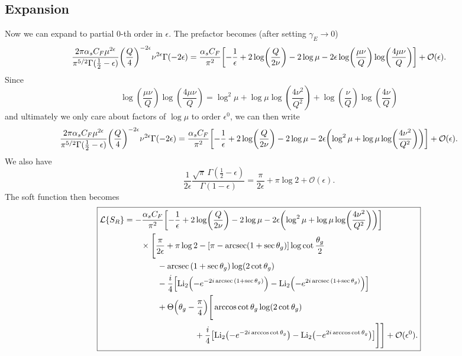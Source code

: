 \documentclass[11pt,twoside,reqno]{amsart}
\theoremstyle{plain}
\theoremstyle{remark}
\theoremstyle{definition}
\theoremstyle{remark}
\theoremstyle{definition}
\theoremstyle{definition}
\newcommand{\cL}{\mathcal{L}}
\newcommand{\cO}{\mathcal{O}}
\newcommand{\Li}{\mathrm{Li}}
\begin{document}
\subsection{Expansion}
	Now we can expand to partial $0$-th order in $\epsilon$. The prefactor becomes (after setting $\gamma_E \to 0$)
	\begin{equation}
	\begin{aligned}
		\frac{2\pi\alpha_s C_F\mu^{2\epsilon}}{\pi^{5/2} \Gamma(\frac{1}{2} - \epsilon)}\qty(\frac{Q}{4})^{-2\epsilon} \nu^{2\epsilon} \Gamma(-2\epsilon) = \frac{\alpha_s C_F}{\pi^2}\qty[-\frac{1}{\epsilon} + 2\log(\frac{Q}{2\nu}) - 2\log\mu - 2\epsilon\log(\frac{\mu\nu}{Q})\log(\frac{4\mu\nu}{Q})] + \cO(\epsilon).
	\end{aligned}
	\end{equation}
	Since
	\begin{equation}
		\log(\frac{\mu\nu}{Q})\log(\frac{4\mu\nu}{Q}) = \log^2\mu + \log\mu\log(\frac{4\nu^2}{Q^2}) + \log(\frac{\nu}{Q})\log(\frac{4\nu}{Q})
	\end{equation}
	and ultimately we only care about factors of $\log \mu$ to order $\epsilon^0$, we can then write
	\begin{equation}
		\frac{2\pi\alpha_s C_F\mu^{2\epsilon}}{\pi^{5/2} \Gamma(\frac{1}{2} - \epsilon)}\qty(\frac{Q}{4})^{-2\epsilon} \nu^{2\epsilon} \Gamma(-2\epsilon) = \frac{\alpha_s C_F}{\pi^2}\qty[-\frac{1}{\epsilon} + 2\log(\frac{Q}{2\nu}) - 2\log\mu - 2\epsilon\qty(\log^2\mu + \log\mu\log(\frac{4\nu^2}{Q^2}))] + \cO(\epsilon).
	\end{equation}
	We also have
	\begin{equation}
		\frac{1}{2\epsilon}\frac{\sqrt{\pi} \, \Gamma(\frac{1}{2} - \epsilon)}{\Gamma(1 - \epsilon)} = \frac{\pi}{2\epsilon} + \pi \log 2 + \cO(\epsilon).
	\end{equation}
	The soft function then becomes
	\begin{equation}\label{eq:transformed soft function partial order}
	\boxed{
	\begin{aligned}
		\cL\qty{S_R} &= -\frac{\alpha_s C_F}{\pi^2}\qty[-\frac{1}{\epsilon} + 2\log(\frac{Q}{2\nu}) - 2\log\mu - 2\epsilon\qty(\log^2\mu + \log\mu\log(\frac{4\nu^2}{Q^2}))] \\
			&\qquad\times \Bigg[\frac{\pi}{2\epsilon} + \pi \log 2 - \qty[\pi - \arcsec(1 + \sec\theta_g)]\log\cot\frac{\theta_g}{2} \\
			&\qquad\qquad - \arcsec\qty(1 + \sec\theta_g) \log(2\cot\theta_g) \\
			&\qquad\qquad - \frac{i}{4}\qty[\Li_2\qty(-e^{-2i\arcsec\qty(1 + \sec\theta_g)}) - \Li_2\qty(-e^{2i\arcsec\qty(1 + \sec\theta_g)})] \\
			&\qquad\qquad+ \Theta\qty(\theta_g - \frac{\pi}{4})\Bigg[ \arccos\cot\theta_g \log(2\cot\theta_g) \\
			&\hspace{3cm}+ \frac{i}{4}\qty[\Li_2\qty(-e^{-2i\arccos\cot\theta_g}) - \Li_2\qty(-e^{2i\arccos\cot\theta_g})] \Bigg] \Bigg] + \cO(\epsilon^0).
	\end{aligned}
	}
	\end{equation}
\end{document}
